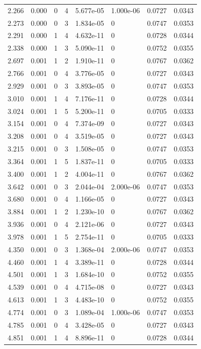 \documentclass[preview]{standalone}
\begin{document}
{{\begin{tabular}{L{1.2cm}C{1.2cm} C{0.3cm}C{0.5cm} C{1.4cm}C{1.4cm} C{1.4cm}C{1.4cm}}
  2.266  &  0.000  & 0     &  4 &  5.677e-05  & 1.000e-06  & 0.0727 &  0.0343   \\ 
  2.273  &  0.000  & 0     &  3 &  1.834e-05  & 0  & 0.0747 &  0.0353   \\ 
  2.291  &  0.000  & 1     &  4 &  4.632e-11  & 0  & 0.0728 &  0.0344   \\ 
  2.338  &  0.000  & 1     &  3 &  5.090e-11  & 0  & 0.0752 &  0.0355   \\ 
  2.697  &  0.001  & 1     &  2 &  1.910e-11  & 0  & 0.0767 &  0.0362   \\ 
  2.766  &  0.001  & 0     &  4 &  3.776e-05  & 0  & 0.0727 &  0.0343   \\ 
  2.929  &  0.001  & 0     &  3 &  3.893e-05  & 0  & 0.0747 &  0.0353   \\ 
  3.010  &  0.001  & 1     &  4 &  7.176e-11  & 0  & 0.0728 &  0.0344   \\ 
  3.024  &  0.001  & 1     &  5 &  5.200e-11  & 0  & 0.0705 &  0.0333   \\ 
  3.154  &  0.001  & 0     &  4 &  7.374e-09  & 0  & 0.0727 &  0.0343   \\ 
  3.208  &  0.001  & 0     &  4 &  3.519e-05  & 0  & 0.0727 &  0.0343   \\ 
  3.215  &  0.001  & 0     &  3 &  1.508e-05  & 0  & 0.0747 &  0.0353   \\ 
  3.364  &  0.001  & 1     &  5 &  1.837e-11  & 0  & 0.0705 &  0.0333   \\ 
  3.400  &  0.001  & 1     &  2 &  4.004e-11  & 0  & 0.0767 &  0.0362   \\ 
  3.642  &  0.001  & 0     &  3 &  2.044e-04  & 2.000e-06  & 0.0747 &  0.0353   \\ 
  3.680  &  0.001  & 0     &  4 &  1.166e-05  & 0  & 0.0727 &  0.0343   \\ 
  3.884  &  0.001  & 1     &  2 &  1.230e-10  & 0  & 0.0767 &  0.0362   \\ 
  3.936  &  0.001  & 0     &  4 &  2.121e-06  & 0  & 0.0727 &  0.0343   \\ 
  3.978  &  0.001  & 1     &  5 &  2.754e-11  & 0  & 0.0705 &  0.0333   \\ 
  4.350  &  0.001  & 0     &  3 &  1.368e-04  & 2.000e-06  & 0.0747 &  0.0353   \\ 
  4.460  &  0.001  & 1     &  4 &  3.389e-11  & 0  & 0.0728 &  0.0344   \\ 
  4.501  &  0.001  & 1     &  3 &  1.684e-10  & 0  & 0.0752 &  0.0355   \\ 
  4.539  &  0.001  & 0     &  4 &  4.715e-08  & 0  & 0.0727 &  0.0343   \\ 
  4.613  &  0.001  & 1     &  3 &  4.483e-10  & 0  & 0.0752 &  0.0355   \\ 
  4.774  &  0.001  & 0     &  3 &  1.089e-04  & 1.000e-06  & 0.0747 &  0.0353   \\ 
  4.785  &  0.001  & 0     &  4 &  3.428e-05  & 0  & 0.0727 &  0.0343   \\ 
  4.851  &  0.001  & 1     &  4 &  8.896e-11  & 0  & 0.0728 &  0.0344   \\ 
\hline 
\end{tabular} 

}}
\end{document}
